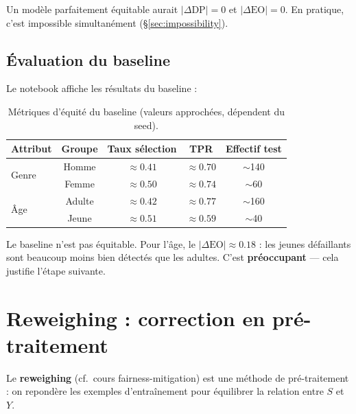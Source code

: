 \documentclass[11pt, a4paper]{article}
\begin{document}
Un mod\`{e}le parfaitement \'{e}quitable aurait $|\Delta\text{DP}| = 0$ et $|\Delta\text{EO}| = 0$. En pratique, c'est impossible simultan\'{e}ment (\S\ref{sec:impossibility}).

\subsection{\'{E}valuation du baseline}

Le notebook affiche les r\'{e}sultats du baseline :

\begin{table}[H]
\centering
\begin{tabular}{lcccc}
\toprule
\textbf{Attribut} & \textbf{Groupe} & \textbf{Taux s\'{e}lection} & \textbf{TPR} & \textbf{Effectif test} \\
\midrule
\multirow{2}{*}{Genre} & Homme & $\approx 0.41$ & $\approx 0.70$ & $\sim$140 \\
& Femme & $\approx 0.50$ & $\approx 0.74$ & $\sim$60 \\
\midrule
\multirow{2}{*}{\^{A}ge} & Adulte & $\approx 0.42$ & $\approx 0.77$ & $\sim$160 \\
& Jeune & $\approx 0.51$ & $\approx 0.59$ & $\sim$40 \\
\bottomrule
\end{tabular}
\caption{M\'{e}triques d'\'{e}quit\'{e} du baseline (valeurs approch\'{e}es, d\'{e}pendent du seed).}
\end{table}

\begin{attentionbox}[Constat]
Le baseline n'est pas \'{e}quitable. Pour l'\^{a}ge, le $|\Delta\text{EO}| \approx 0.18$ : les jeunes d\'{e}faillants sont beaucoup moins bien d\'{e}tect\'{e}s que les adultes. C'est \textbf{pr\'{e}occupant} --- cela justifie l'\'{e}tape suivante.
\end{attentionbox}

\section{Reweighing : correction en pr\'{e}-traitement}
\label{sec:reweighing}

\begin{questionbox}
Le \textbf{reweighing} (cf.~cours fairness-mitigation) est une m\'{e}thode de pr\'{e}-traitement : on repondère les exemples d'entra\^{i}nement pour \'{e}quilibrer la relation entre $S$ et $Y$.
\end{questionbox}
\end{document}
